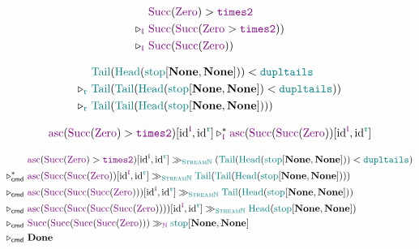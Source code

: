 \begin{minipage}{0.4\textwidth}
  \begin{align*}
    \phantom{\reducesto_{\polprd}}
    &
    \Succ(\Zero) > \timestwo
    \\
    \reducesto_{\polprd}\
    &
    \Succ(\Succ(\Zero > \timestwo))
    \\
    \reducesto_{\polprd}\
    &
    \Succ(\Succ(\Zero))
  \end{align*}
\end{minipage}
\begin{minipage}{0.5\textwidth}
  \begin{align*}
    \phantom{\reducesto_{\polcon}}
    &
    \Tail(\Head(\stopNat[\None, \None])) < \dupltails
    \\
    \reducesto_{\polcon}\
    &
    \Tail(\Tail(\Head(\stopNat[\None, \None]) < \dupltails))
    \\
    \reducesto_{\polcon}\
    &
    \Tail(\Tail(\Head(\stopNat[\None, \None])))
  \end{align*}
\end{minipage}

\begin{align*}
  \asc(\Succ(\Zero) > \timestwo)[\text{id}^{\polprd}, \text{id}^{\polcon}]
  \reducesto_{\polprd}^{\ast}
  \asc(\Succ(\Succ(\Zero))[\text{id}^{\polprd}, \text{id}^{\polcon}]
\end{align*}

\begin{align*}
  \phantom{\reducesto_{\cmd}}
  &
  \asc(\Succ(\Zero) > \timestwo)[\text{id}^{\polprd}, \text{id}^{\polcon}]
  \mkCmd_{\StreamNat}
  (\Tail(\Head(\stopNat[\None, \None])) < \dupltails)
  \\
  \reducesto_{\cmd}^{\ast}\
  &
  \asc(\Succ(\Succ(\Zero))[\text{id}^{\polprd}, \text{id}^{\polcon}]
  \mkCmd_{\StreamNat}
  \Tail(\Tail(\Head(\stopNat[\None, \None])))
  \\
  \reducesto_{\cmd}\
  &
  \asc(\Succ(\Succ(\Succ(\Zero)))[\text{id}^{\polprd}, \text{id}^{\polcon}]
  \mkCmd_{\StreamNat}
  \Tail(\Head(\stopNat[\None, \None]))
  \\
  \reducesto_{\cmd}\
  &
  \asc(\Succ(\Succ(\Succ(\Succ(\Zero))))[\text{id}^{\polprd}, \text{id}^{\polcon}]
  \mkCmd_{\StreamNat}
  \Head(\stopNat[\None, \None])
  \\
  \reducesto_{\cmd}\
  &
  \Succ(\Succ(\Succ(\Succ(\Zero)))
  \mkCmd_{\Nat}
  \stopNat[\None, \None]
  \\
  \reducesto_{\cmd}\
  &
  \Done
\end{align*}

